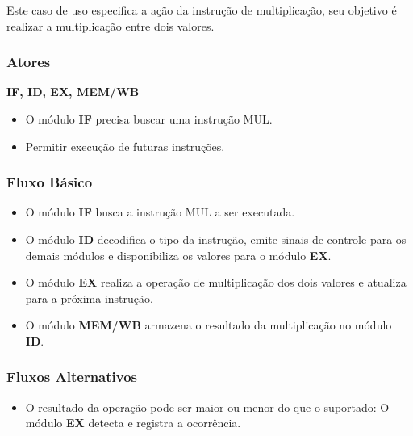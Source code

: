 
Este caso de uso especifica a ação da instrução de multiplicação, seu objetivo é realizar a multiplicação entre dois valores.
 
\subsubsection*{Atores}
\textbf{IF, ID, EX, MEM/WB}

\preconditions 
\begin{itemize}
 \item O módulo \textbf{IF} precisa buscar uma instrução MUL.
\end{itemize}

\postconditions
\begin{itemize}
  \item Permitir execução de futuras instruções.
\end{itemize}

\subsubsection*{Fluxo Básico}
\begin{itemize}
\item O módulo \textbf{IF} busca a instrução MUL a ser executada.
\item O módulo \textbf{ID} decodifica o tipo da instrução, emite sinais de controle para os demais módulos e disponibiliza os valores para o módulo \textbf{EX}.
\item O módulo \textbf{EX} realiza a operação de multiplicação dos dois valores e atualiza para a próxima instrução.
\item O módulo \textbf{MEM/WB} armazena o resultado da multiplicação no módulo \textbf{ID}.
\end{itemize}

\subsubsection*{Fluxos Alternativos}
\begin{itemize}
\item O resultado da operação pode ser maior ou menor do que o suportado:
\subitem O módulo \textbf{EX} detecta e registra a ocorrência.
\end{itemize}

%		


